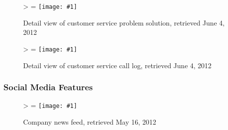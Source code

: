 \documentclass[11pt,letterpaper]{article}
\newcommand{\downloadDate}{May 16, 2012}
\newlength{\imgwidth}
\newlength{\imgheight}
\newlength{\finalwidth}
\newlength{\finalheight}
\newlength{\imgtextheight}
\newcommand{\scalegraphics}[1]{%
	\settowidth{\imgwidth}{\texttt{[image: \#1]}}%
	\settoheight{\imgheight}{\texttt{[image: \#1]}}%
	\ifnum\imgwidth>\imgheight \def\imgangle{90} \else \def\imgangle{0} \fi%
	\setlength{\imgtextheight}{0.74\textheight}%
	\setlength{\finalwidth}{\minof{\imgwidth}{\textwidth}}%
	\setlength{\finalheight}{\minof{\imgheight}{\imgtextheight}}%
	\ifnum\finalwidth=\imgwidth \def\imgangle{0} \fi%
	\texttt{[image: \#1]}%
}
\begin{document}
\begin{figure}[htbp]
	\centering
	\scalegraphics{./img/force/frce_solution_detail}
	\caption[salesforce.com: Detail view of customer service problem solution]{Detail view of customer service problem solution, retrieved June 4, 2012}
\end{figure}

\begin{figure}[htbp]
	\centering
	\scalegraphics{./img/force/frce_call_log}
	\caption[salesforce.com: Detail view of customer service call log]{Detail view of customer service call log, retrieved June 4, 2012}
\end{figure}

\newpage
\FloatBarrier
\subsubsection{Social Media Features}
\begin{figure}[htbp]
	\centering
	\scalegraphics{./img/force/frce_company_feed}
	\caption[salesforce.com: Company news feed]{Company news feed, retrieved \downloadDate}
\end{figure}
\end{document}
